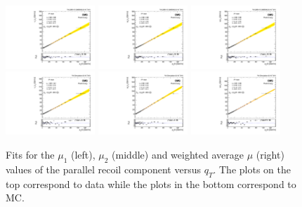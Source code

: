 \begin{figure}
 \begin{center}
  \includegraphics[width=0.3\textwidth]{Figures/WBoson/Analysis/Correction/Recoil/RecoilFitsqT/Data/fitPFu1mean1.pdf}
  \includegraphics[width=0.3\textwidth]{Figures/WBoson/Analysis/Correction/Recoil/RecoilFitsqT/Data/fitPFu1mean2.pdf}
  \includegraphics[width=0.3\textwidth]{Figures/WBoson/Analysis/Correction/Recoil/RecoilFitsqT/Data/fitPFu1mean.pdf} \\
  \includegraphics[width=0.3\textwidth]{Figures/WBoson/Analysis/Correction/Recoil/RecoilFitsqT/MC/fitPFu1mean1.pdf}
  \includegraphics[width=0.3\textwidth]{Figures/WBoson/Analysis/Correction/Recoil/RecoilFitsqT/MC/fitPFu1mean2.pdf}
  \includegraphics[width=0.3\textwidth]{Figures/WBoson/Analysis/Correction/Recoil/RecoilFitsqT/MC/fitPFu1mean.pdf}
 \caption{Fits for the $\mu_{1}$ (left), $\mu_{2}$ (middle) and weighted average $\mu$ (right) values of the parallel recoil component versus $q_{T}$. The plots on the top correspond to data while the plots in the bottom correspond to \ZToMuMu MC.}
 \label{fig:figU1RecoilScaleFit}
 \end{center}
\end{figure}

